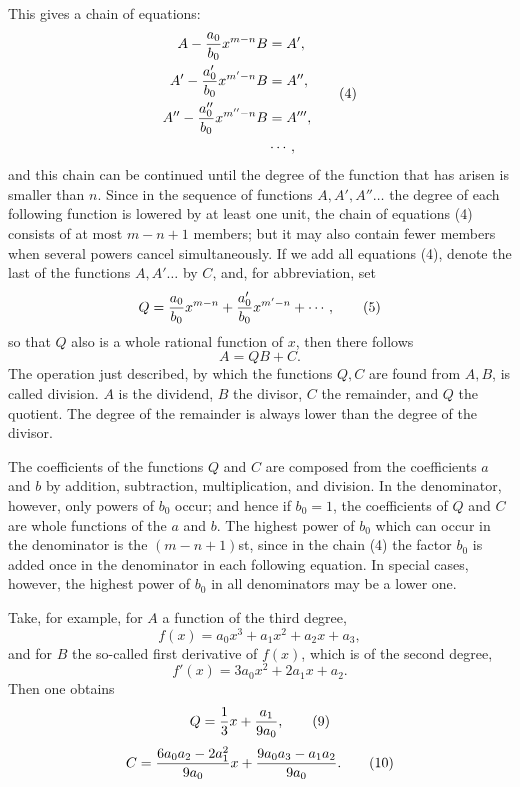 \documentclass[11pt]{article}
\begin{document}
This gives a chain of equations:
\begin{equation}
\begin{aligned}
 A-{a_0\over b_0}x^{m-n}B&=A',\\
 A'-{a'_0\over b_0}x^{m'-n}B&=A'',\\
 A''-{a''_0\over b_0}x^{m''-n}B&=A''',\\
 &\cdots,
\end{aligned}
\tag{4}
\end{equation}
and this chain can be continued until the degree of the function that has arisen is smaller than $n$. Since in the sequence of functions $A,A',A''\ldots$ the degree of each following function is lowered by at least one unit, the chain of equations (4) consists of at most $m-n+1$ members; but it may also contain fewer members when several powers cancel simultaneously. If we add all equations (4), denote the last of the functions $A,A'\ldots$ by $C$, and, for abbreviation, set
\begin{equation}
 Q={a_0\over b_0}x^{m-n}+{a'_0\over b_0}x^{m'-n}+\cdots,
\tag{5}
\end{equation}
so that $Q$ also is a whole rational function of $x$, then there follows
\begin{equation}
 A=QB+C.
\tag{6}
\end{equation}
The operation just described, by which the functions $Q,C$ are found from $A,B$, is called division. $A$ is the dividend, $B$ the divisor, $C$ the remainder, and $Q$ the quotient. The degree of the remainder is always lower than the degree of the divisor.

The coefficients of the functions $Q$ and $C$ are composed from the coefficients $a$ and $b$ by addition, subtraction, multiplication, and division. In the denominator, however, only powers of $b_0$ occur; and hence if $b_0=1$, the coefficients of $Q$ and $C$ are whole functions of the $a$ and $b$. The highest power of $b_0$ which can occur in the denominator is the $(m-n+1)$st, since in the chain (4) the factor $b_0$ is added once in the denominator in each following equation. In special cases, however, the highest power of $b_0$ in all denominators may be a lower one.

Take, for example, for $A$ a function of the third degree,
\begin{equation}
 f(x)=a_0x^3+a_1x^2+a_2x+a_3,
\tag{7}
\end{equation}
and for $B$ the so-called first derivative of $f(x)$, which is of the second degree,
\begin{equation}
 f'(x)=3a_0x^2+2a_1x+a_2.
\tag{8}
\end{equation}
Then one obtains
\begin{equation}
 Q={1\over 3}x+{a_1\over 9a_0},
\tag{9}
\end{equation}
\begin{equation}
 C={6a_0a_2-2a_1^2\over 9a_0}x+{9a_0a_3-a_1a_2\over 9a_0}.
\tag{10}
\end{equation}
\end{document}
